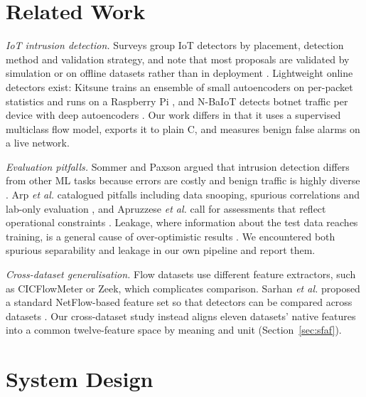 \documentclass[conference]{IEEEtran}
\begin{document}
\section{Related Work}\label{sec:related}

\textit{IoT intrusion detection.}
Surveys group IoT detectors by placement, detection method and validation
strategy, and note that most proposals are validated by simulation or on
offline datasets rather than in deployment
\cite{zarpelao2017survey,hajiheidari2019ids,khraisat2021critical}.
Lightweight online detectors exist: Kitsune trains an ensemble of small
autoencoders on per-packet statistics and runs on a Raspberry Pi
\cite{mirsky2018kitsune}, and N-BaIoT detects botnet traffic per device
with deep autoencoders \cite{meidan2018nbaiot}. Our work differs in that it
uses a supervised multiclass flow model, exports it to plain C, and measures
benign false alarms on a live network.

\textit{Evaluation pitfalls.}
Sommer and Paxson argued that intrusion detection differs from other ML
tasks because errors are costly and benign traffic is highly diverse
\cite{sommer2010outside}. Arp \textit{et al.} catalogued pitfalls including
data snooping, spurious correlations and lab-only evaluation
\cite{arp2022dos}, and Apruzzese \textit{et al.} call for assessments that
reflect operational constraints \cite{apruzzese2023sok}. Leakage, where
information about the test data reaches training, is a general cause of
over-optimistic results \cite{kaufman2012leakage}. We encountered both
spurious separability and leakage in our own pipeline and report them.

\textit{Cross-dataset generalisation.}
Flow datasets use different feature extractors, such as CICFlowMeter
\cite{lashkari2017cicflowmeter} or Zeek, which complicates comparison.
Sarhan \textit{et al.} proposed a standard NetFlow-based feature set so
that detectors can be compared across datasets \cite{sarhan2022standard}.
Our cross-dataset study instead aligns eleven datasets' native features
into a common twelve-feature space by meaning and unit
(Section~\ref{sec:sfaf}).

\section{System Design}\label{sec:system}
\end{document}

